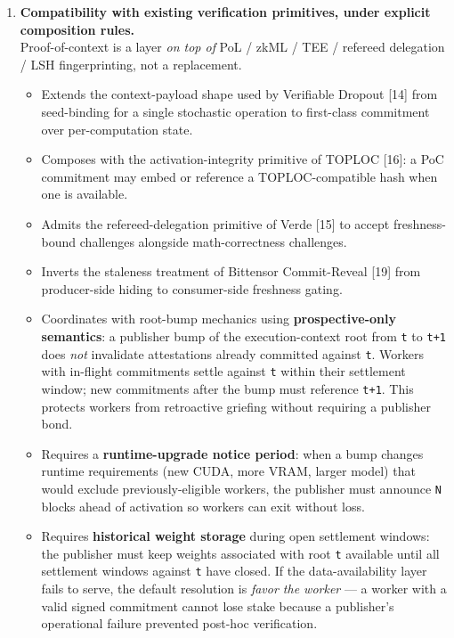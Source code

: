 \documentclass[11pt]{article}
\begin{document}
\begin{enumerate}
\item \textbf{Compatibility with existing verification primitives, under explicit composition rules.}\\
Proof-of-context is a layer \emph{on top of} PoL / zkML / TEE / refereed delegation / LSH fingerprinting, not a replacement.
\begin{itemize}
\item Extends the context-payload shape used by Verifiable Dropout [14] from seed-binding for a single stochastic operation to first-class commitment over per-computation state.
\item Composes with the activation-integrity primitive of TOPLOC [16]: a PoC commitment may embed or reference a TOPLOC-compatible hash when one is available.
\item Admits the refereed-delegation primitive of Verde [15] to accept freshness-bound challenges alongside math-correctness challenges.
\item Inverts the staleness treatment of Bittensor Commit-Reveal [19] from producer-side hiding to consumer-side freshness gating.
\item Coordinates with root-bump mechanics using \textbf{prospective-only semantics}: a publisher bump of the execution-context root from \texttt{t} to \texttt{t+1} does \emph{not} invalidate attestations already committed against \texttt{t}. Workers with in-flight commitments settle against \texttt{t} within their settlement window; new commitments after the bump must reference \texttt{t+1}. This protects workers from retroactive griefing without requiring a publisher bond.
\item Requires a \textbf{runtime-upgrade notice period}: when a bump changes runtime requirements (new CUDA, more VRAM, larger model) that would exclude previously-eligible workers, the publisher must announce \texttt{N} blocks ahead of activation so workers can exit without loss.
\item Requires \textbf{historical weight storage} during open settlement windows: the publisher must keep weights associated with root \texttt{t} available until all settlement windows against \texttt{t} have closed. If the data-availability layer fails to serve, the default resolution is \emph{favor the worker} --- a worker with a valid signed commitment cannot lose stake because a publisher's operational failure prevented post-hoc verification.
\end{itemize}


\end{enumerate}
\end{document}
